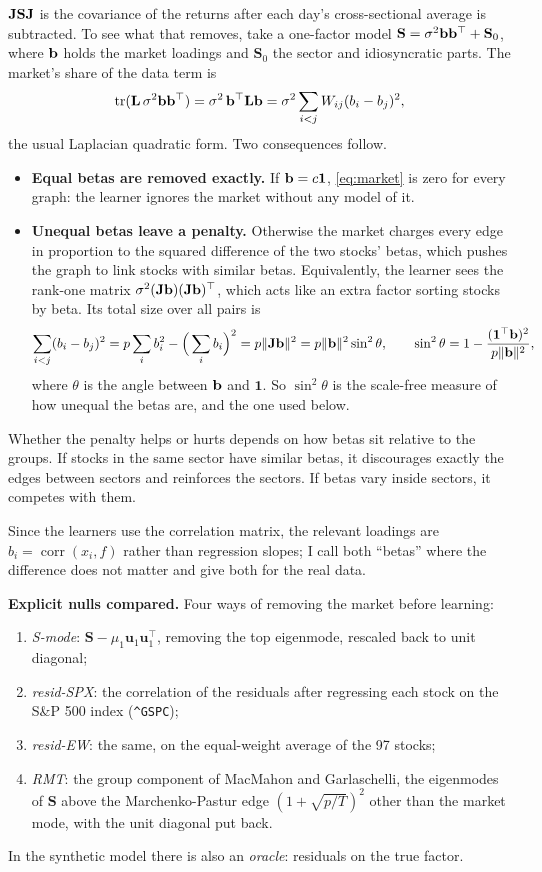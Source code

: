 \documentclass[11pt,a4paper]{article}
\newcommand{\Lap}{\mathbf{L}}
\newcommand{\Smat}{\mathbf{S}}
\newcommand{\uvec}{\mathbf{u}}
\newcommand{\one}{\mathbf{1}}
\newcommand{\tr}{\operatorname{tr}}
\theoremstyle{remark}
\begin{document}
$\Jmat\Smat\Jmat$ is the covariance of the returns after each day's cross-sectional
average is subtracted. To see what that removes, take a one-factor model
$\Smat=\sigma^2\bvec\bvec^\top+\Smat_0$, where $\mathbf b$ holds the market loadings and
$\Smat_0$ the sector and idiosyncratic parts. The market's share of the data term is
\begin{equation}\label{eq:market}
  \tr(\Lap\,\sigma^2\bvec\bvec^\top)=\sigma^2\,\bvec^\top\Lap\bvec
  =\sigma^2\sum_{i<j}W_{ij}(b_i-b_j)^2 ,
\end{equation}
the usual Laplacian quadratic form. Two consequences follow.
\begin{itemize}
\item \textbf{Equal betas are removed exactly.} If $\bvec=c\one$, \eqref{eq:market} is
  zero for every graph: the learner ignores the market without any model of it.
\item \textbf{Unequal betas leave a penalty.} Otherwise the market charges every edge
  in proportion to the squared difference of the two stocks' betas, which pushes the
  graph to link stocks with similar betas. Equivalently, the learner sees the rank-one
  matrix $\sigma^2(\mathbf J\mathbf b)(\mathbf J\mathbf b)^\top$, which acts like an extra factor sorting
  stocks by beta. Its total size over all pairs is
  \[
    \sum_{i<j}(b_i-b_j)^2=p\sum_ib_i^2-\Big(\sum_ib_i\Big)^2=p\lVert\Jmat\bvec\rVert^2
    =p\lVert\bvec\rVert^2\sin^2\theta,
    \qquad
    \sin^2\theta=1-\frac{(\one^\top\bvec)^2}{p\lVert\bvec\rVert^2},
  \]
  where $\theta$ is the angle between $\mathbf b$ and $\one$. So $\sin^2\theta$ is the
  scale-free measure of how unequal the betas are, and the one used below.
\end{itemize}
Whether the penalty helps or hurts depends on how betas sit relative to the groups.
If stocks in the same sector have similar betas, it discourages exactly the edges
between sectors and reinforces the sectors. If betas vary inside sectors, it competes
with them.

Since the learners use the correlation matrix, the relevant loadings are
$b_i=\operatorname{corr}(x_i,f)$ rather than regression slopes; I call both ``betas''
where the difference does not matter and give both for the real data.

\textbf{Explicit nulls compared.} Four ways of removing the market before learning:
\begin{enumerate}[label=(\roman*)]
\item \emph{S-mode}: $\Smat-\mu_1\uvec_1\uvec_1^\top$, removing the top eigenmode,
  rescaled back to unit diagonal;
\item \emph{resid-SPX}: the correlation of the residuals after regressing each stock on
  the S\&P 500 index (\texttt{\^{}GSPC});
\item \emph{resid-EW}: the same, on the equal-weight average of the 97 stocks;
\item \emph{RMT}: the group component of MacMahon and Garlaschelli, the eigenmodes of
  $\Smat$ above the Marchenko-Pastur edge $(1+\sqrt{p/T})^2$ other than the market mode,
  with the unit diagonal put back.
\end{enumerate}
In the synthetic model there is also an \emph{oracle}: residuals on the true factor.
\end{document}
